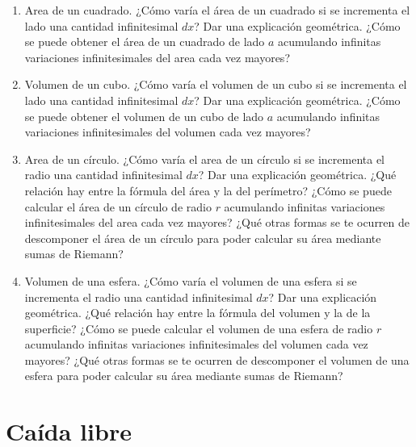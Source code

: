\documentclass[
  a4paper,
]{scrreport}
\begin{document}
\begin{enumerate}
\def\labelenumi{\arabic{enumi}.}
\item
  Area de un cuadrado. ¿Cómo varía el área de un cuadrado si se
  incrementa el lado una cantidad infinitesimal \(dx\)? Dar una
  explicación geométrica. ¿Cómo se puede obtener el área de un cuadrado
  de lado \(a\) acumulando infinitas variaciones infinitesimales del
  area cada vez mayores?
\item
  Volumen de un cubo. ¿Cómo varía el volumen de un cubo si se incrementa
  el lado una cantidad infinitesimal \(dx\)? Dar una explicación
  geométrica. ¿Cómo se puede obtener el volumen de un cubo de lado \(a\)
  acumulando infinitas variaciones infinitesimales del volumen cada vez
  mayores?
\item
  Area de un círculo. ¿Cómo varía el area de un círculo si se incrementa
  el radio una cantidad infinitesimal \(dx\)? Dar una explicación
  geométrica. ¿Qué relación hay entre la fórmula del área y la del
  perímetro? ¿Cómo se puede calcular el área de un círculo de radio
  \(r\) acumulando infinitas variaciones infinitesimales del area cada
  vez mayores? ¿Qué otras formas se te ocurren de descomponer el área de
  un círculo para poder calcular su área mediante sumas de Riemann?
\item
  Volumen de una esfera. ¿Cómo varía el volumen de una esfera si se
  incrementa el radio una cantidad infinitesimal \(dx\)? Dar una
  explicación geométrica. ¿Qué relación hay entre la fórmula del volumen
  y la de la superficie? ¿Cómo se puede calcular el volumen de una
  esfera de radio \(r\) acumulando infinitas variaciones infinitesimales
  del volumen cada vez mayores? ¿Qué otras formas se te ocurren de
  descomponer el volumen de una esfera para poder calcular su área
  mediante sumas de Riemann?
\end{enumerate}


\chapter{Caída libre}\label{cauxedda-libre}
\end{document}
